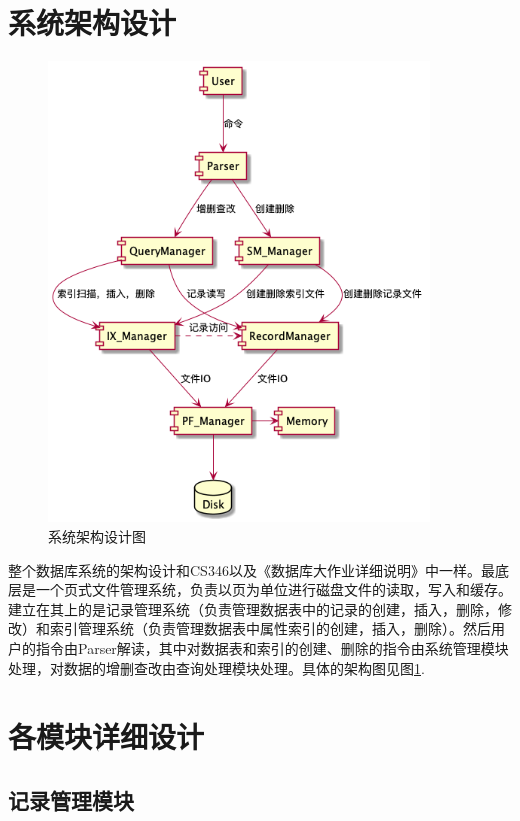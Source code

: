 \documentclass[11pt,UTF8]{report}
\begin{document}
\section{系统架构设计}
\begin{figure}[!ht]
	\centering
	\includegraphics[width=0.9\textwidth]{structure}
	\caption{系统架构设计图}
	\label{fig:structure}
\end{figure}

整个数据库系统的架构设计和CS346以及《数据库大作业详细说明》中一样。最底层是一个页式文件管理系统，负责以页为单位进行磁盘文件的读取，写入和缓存。建立在其上的是记录管理系统（负责管理数据表中的记录的创建，插入，删除，修改）和索引管理系统（负责管理数据表中属性索引的创建，插入，删除）。然后用户的指令由Parser解读，其中对数据表和索引的创建、删除的指令由系统管理模块处理，对数据的增删查改由查询处理模块处理。具体的架构图见图\ref{fig:structure}.

\section{各模块详细设计}
\subsection{记录管理模块}
\end{document}
